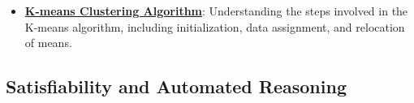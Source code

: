 \documentclass{article}%
\begin{document}
\begin{itemize}[leftmargin=*]
\item \href{https://purdue.brightspace.com/d2l/common/assets/pdfjs-d2l-dist/1.0.14-legacy/web/viewer.html?file=\%2Fcontent\%2Fenforced\%2F1095467-wl.202510.CS.24300.001\%2F12L2-distance-clusters.pdf\%3Fou\%3D1095467\&lang=en-us\&container=d2l-fileviewer-rendered-pdf\&fullscreen=d2l-fileviewer-rendered-pdf-dialog\&height=667#page=22}{\textbf{K-means Clustering Algorithm}}: Understanding the steps involved in the K-means algorithm, including initialization, data assignment, and relocation of means.%
\end{itemize}

%
\subsection{Satisfiability and Automated Reasoning}%
\label{subsec:SatisfiabilityandAutomatedReasoning}%
\end{document}
